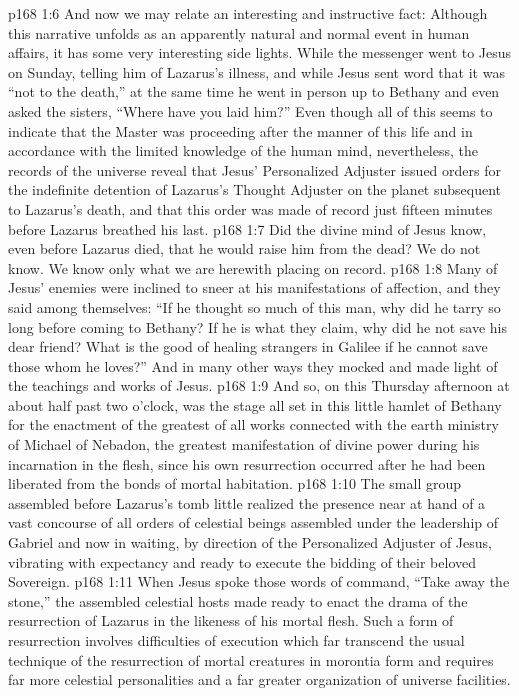 \pc \vs p168 1:6 And now we may relate an interesting and instructive fact: Although this narrative unfolds as an apparently natural and normal event in human affairs, it has some very interesting side lights. While the messenger went to Jesus on Sunday, telling him of Lazarus’s illness, and while Jesus sent word that it was \textcolor{ubdarkred}{“not to the death,”} at the same time he went in person up to Bethany and even asked the sisters, \textcolor{ubdarkred}{“Where have you laid him?”} Even though all of this seems to indicate that the Master was proceeding after the manner of this life and in accordance with the limited knowledge of the human mind, nevertheless, the records of the universe reveal that Jesus’ Personalized Adjuster issued orders for the indefinite detention of Lazarus’s Thought Adjuster on the planet subsequent to Lazarus’s death, and that this order was made of record just fifteen minutes before Lazarus breathed his last.
\vs p168 1:7 Did the divine mind of Jesus know, even before Lazarus died, that he would raise him from the dead? We do not know. We know only what we are herewith placing on record.
\pc \vs p168 1:8 Many of Jesus’ enemies were inclined to sneer at his manifestations of affection, and they said among themselves: “If he thought so much of this man, why did he tarry so long before coming to Bethany? If he is what they claim, why did he not save his dear friend? What is the good of healing strangers in Galilee if he cannot save those whom he loves?” And in many other ways they mocked and made light of the teachings and works of Jesus.
\vs p168 1:9 And so, on this Thursday afternoon at about half past two o’clock, was the stage all set in this little hamlet of Bethany for the enactment of the greatest of all works connected with the earth ministry of Michael of Nebadon, the greatest manifestation of divine power during his incarnation in the flesh, since his own resurrection occurred after he had been liberated from the bonds of mortal habitation.
\vs p168 1:10 The small group assembled before Lazarus’s tomb little realized the presence near at hand of a vast concourse of all orders of celestial beings assembled under the leadership of Gabriel and now in waiting, by direction of the Personalized Adjuster of Jesus, vibrating with expectancy and ready to execute the bidding of their beloved Sovereign.
\vs p168 1:11 When Jesus spoke those words of command, \textcolor{ubdarkred}{“Take away the stone,”} the assembled celestial hosts made ready to enact the drama of the resurrection of Lazarus in the likeness of his mortal flesh. Such a form of resurrection involves difficulties of execution which far transcend the usual technique of the resurrection of mortal creatures in morontia form and requires far more celestial personalities and a far greater organization of universe facilities.
